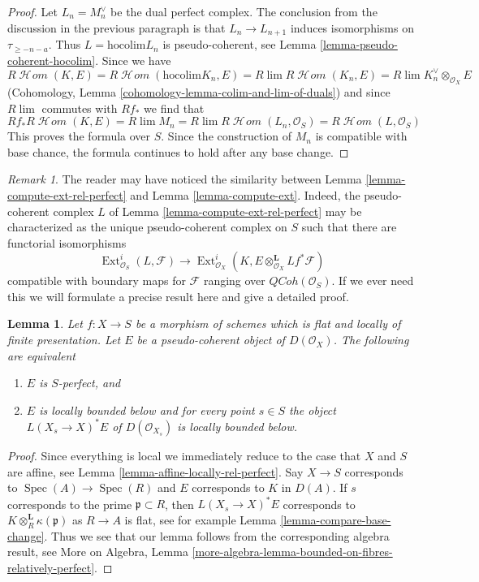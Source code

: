 \documentclass{stacks-project}
\theoremstyle{plain}
\newtheorem{lemma}[subsection]{Lemma}
\theoremstyle{definition}
\theoremstyle{remark}
\newtheorem{remark}[subsection]{Remark}
\numberwithin{equation}{subsection}
\def\lim{\mathop{\mathrm{lim}}\nolimits}
\def\Spec{\mathop{\mathrm{Spec}}}
\def\Ext{\mathop{\mathrm{Ext}}\nolimits}
\def\SheafHom{\mathop{\mathcal{H}\!\mathit{om}}\nolimits}
\def\QCoh{\mathit{QCoh}}
\begin{document}
\begin{proof}
\medskip\noindent
Let $L_n = M_n^\vee$ be the dual perfect complex. The
conclusion from the discussion in the previous paragraph is that
$L_n \to L_{n + 1}$ induces isomorphisms on $\tau_{\geq -n - a}$.
Thus $L = \text{hocolim} L_n$ is pseudo-coherent, see
Lemma \ref{lemma-pseudo-coherent-hocolim}.
Since we have
$$
R\SheafHom(K, E) = R\SheafHom(\text{hocolim} K_n, E) =
R\lim R\SheafHom(K_n, E) = R\lim K_n^\vee \otimes_{\mathcal{O}_X} E
$$
(Cohomology, Lemma \ref{cohomology-lemma-colim-and-lim-of-duals})
and since $R\lim$ commutes with $Rf_*$ we find that
$$
Rf_*R\SheafHom(K, E) = R\lim M_n = R\lim R\SheafHom(L_n, \mathcal{O}_S) =
R\SheafHom(L, \mathcal{O}_S)
$$
This proves the formula over $S$. Since the construction of $M_n$ is
compatible with base chance, the formula continues to hold after
any base change.
\end{proof}

\begin{remark}
\label{remark-compare-L}
The reader may have noticed the similarity between
Lemma \ref{lemma-compute-ext-rel-perfect} and
Lemma \ref{lemma-compute-ext}.
Indeed, the pseudo-coherent complex $L$ of
Lemma \ref{lemma-compute-ext-rel-perfect}
may be characterized as the unique pseudo-coherent complex
on $S$ such that there are functorial isomorphisms
$$
\Ext^i_{\mathcal{O}_S}(L, \mathcal{F}) \longrightarrow
\Ext^i_{\mathcal{O}_X}(K,
E \otimes_{\mathcal{O}_X}^\mathbf{L} Lf^*\mathcal{F})
$$
compatible with boundary maps for $\mathcal{F}$ ranging over
$\QCoh(\mathcal{O}_S)$. If we ever need this we will
formulate a precise result here and give a detailed proof.
\end{remark}

\begin{lemma}
\label{lemma-bounded-on-fibres}
Let $f : X \to S$ be a morphism of schemes which is flat and
locally of finite presentation. Let $E$ be a pseudo-coherent
object of $D(\mathcal{O}_X)$. The following are equivalent
\begin{enumerate}
\item $E$ is $S$-perfect, and
\item $E$ is locally bounded below and for every point $s \in S$
the object $L(X_s \to X)^*E$ of $D(\mathcal{O}_{X_s})$
is locally bounded below.
\end{enumerate}
\end{lemma}

\begin{proof}
Since everything is local we immediately reduce to the
case that $X$ and $S$ are affine, see Lemma
\ref{lemma-affine-locally-rel-perfect}.
Say $X \to S$ corresponds to $\Spec(A) \to \Spec(R)$ and
$E$ corresponds to $K$ in $D(A)$. If $s$ corresponds to
the prime $\mathfrak p \subset R$, then $L(X_s \to X)^*E$
corresponds to $K \otimes_R^\mathbf{L} \kappa(\mathfrak p)$
as $R \to A$ is flat, see for example
Lemma \ref{lemma-compare-base-change}.
Thus we see that our lemma follows from the corresponding algebra
result, see More on Algebra, Lemma
\ref{more-algebra-lemma-bounded-on-fibres-relatively-perfect}.
\end{proof}
\end{document}
